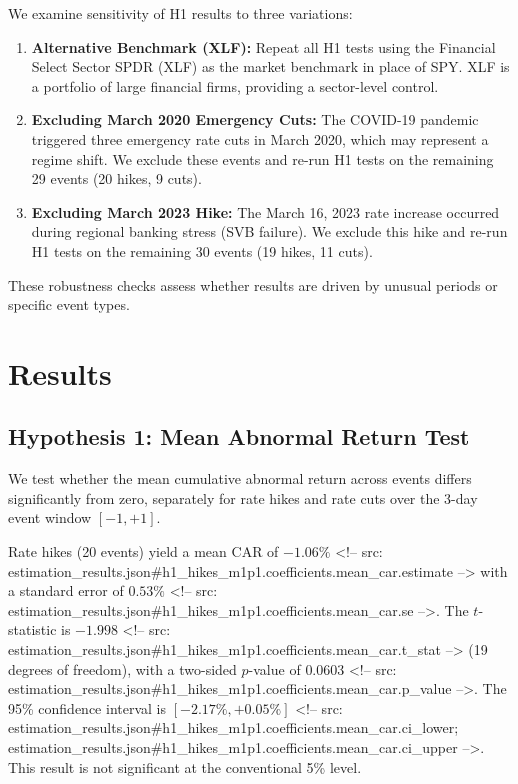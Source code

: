 \documentclass[11pt]{article}
\begin{document}
We examine sensitivity of H1 results to three variations:

\begin{enumerate}
	\item \textbf{Alternative Benchmark (XLF):} Repeat all H1 tests using the Financial Select Sector SPDR (XLF) as the market benchmark in place of SPY. XLF is a portfolio of large financial firms, providing a sector-level control.

	\item \textbf{Excluding March 2020 Emergency Cuts:} The COVID-19 pandemic triggered three emergency rate cuts in March 2020, which may represent a regime shift. We exclude these events and re-run H1 tests on the remaining 29 events (20 hikes, 9 cuts).

	\item \textbf{Excluding March 2023 Hike:} The March 16, 2023 rate increase occurred during regional banking stress (SVB failure). We exclude this hike and re-run H1 tests on the remaining 30 events (19 hikes, 11 cuts).
\end{enumerate}

These robustness checks assess whether results are driven by unusual periods or specific event types.

\section{Results}

\subsection{Hypothesis 1: Mean Abnormal Return Test}



We test whether the mean cumulative abnormal return across events differs significantly from zero, separately for rate hikes and rate cuts over the 3-day event window $[-1, +1]$.

Rate hikes (20 events) yield a mean CAR of $-1.06\%$ <!-- src: estimation_results.json#h1_hikes_m1p1.coefficients.mean_car.estimate --> with a standard error of $0.53\%$ <!-- src: estimation_results.json#h1_hikes_m1p1.coefficients.mean_car.se -->. The $t$-statistic is $-1.998$ <!-- src: estimation_results.json#h1_hikes_m1p1.coefficients.mean_car.t_stat --> (19 degrees of freedom), with a two-sided $p$-value of $0.0603$ <!-- src: estimation_results.json#h1_hikes_m1p1.coefficients.mean_car.p_value -->. The 95\% confidence interval is $[-2.17\%, +0.05\%]$ <!-- src: estimation_results.json#h1_hikes_m1p1.coefficients.mean_car.ci_lower; estimation_results.json#h1_hikes_m1p1.coefficients.mean_car.ci_upper -->. This result is not significant at the conventional 5\% level.
\end{document}
